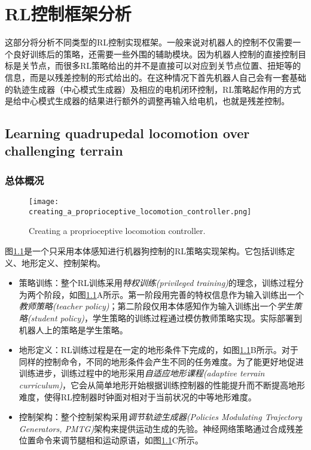 
\chapter{RL控制框架分析}

这部分将分析不同类型的RL控制实现框架。一般来说对机器人的控制不仅需要一个良好训练后的策略，还需要一些外围的辅助模块。因为机器人控制的直接控制目标是关节点，而很多RL策略给出的并不是直接可以对应到关节点位置、扭矩等的信息，而是以残差控制的形式给出的。在这种情况下首先机器人自己会有一套基础的轨迹生成器（中心模式生成器）及相应的电机闭环控制，RL策略起作用的方式是给中心模式生成器的结果进行额外的调整再输入给电机，也就是残差控制。

\section[RL案例1]{Learning quadrupedal locomotion over challenging terrain\cite[p7]{Lee_Hwangbo_Wellhausen_Koltun_Hutter_2020}}

\subsection[总体概况]{总体概况}

\begin{figure}
    \centering
    \texttt{[image: creating\_a\_proprioceptive\_locomotion\_controller.png]}
    \caption{Creating a proprioceptive locomotion controller\cite[p7]{Lee_Hwangbo_Wellhausen_Koltun_Hutter_2020}.}
    \label{fig:creating_a_proprioceptive_locomotion_controller}
\end{figure}

  图\ref{fig:creating_a_proprioceptive_locomotion_controller}是一个只采用本体感知进行机器狗控制的RL策略实现架构。它包括训练定义、地形定义、控制架构。
  \begin{itemize}
    \item 策略训练：整个RL训练采用\emph{特权训练(privileged training)}\cite[p]{Chen_Zhou_Koltun_Krähenbühl_2019}的理念，训练过程分为两个阶段，如图\ref{fig:creating_a_proprioceptive_locomotion_controller}A所示。第一阶段用完善的特权信息作为输入训练出一个\emph{教师策略(teacher policy)}；第二阶段仅用本体感知作为输入训练出一个\emph{学生策略(student policy)}，学生策略的训练过程通过模仿教师策略实现。实际部署到机器人上的策略是学生策略。
    \item 地形定义：RL训练过程是在一定的地形条件下完成的，如图\ref{fig:creating_a_proprioceptive_locomotion_controller}B所示。对于同样的控制命令，不同的地形条件会产生不同的任务难度。为了能更好地促进训练进步，训练过程中的地形采用\emph{自适应地形课程(adaptive terrain curriculum)}，它会从简单地形开始根据训练控制器的性能提升而不断提高地形难度，使得RL控制器时钟面对相对于当前状况的中等地形难度。
    \item 控制架构：整个控制架构采用\emph{调节轨迹生成器(Policies Modulating Trajectory Generators, PMTG)\cite[p]{Iscen_Caluwaerts_Tan_Zhang_Coumans_Sindhwani_Vanhoucke_2018}}架构来提供运动生成的先验。神经网络策略通过合成残差位置命令来调节腿相和运动原语，如图\ref{fig:creating_a_proprioceptive_locomotion_controller}C所示。
  \end{itemize}


